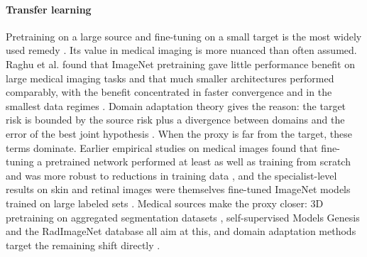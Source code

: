 \documentclass[acmsmall,screen,review]{acmart}
\theoremstyle{acmdefinition}
\begin{document}
\paragraph{Transfer learning} Pretraining on a large source and fine-tuning on a small target is the most widely used remedy \cite{pan2010survey}. Its value in medical imaging is more nuanced than often  assumed. Raghu et al. found that ImageNet pretraining gave little performance benefit on large medical imaging tasks and that much smaller architectures performed comparably, with the benefit concentrated in faster convergence and in the smallest data regimes \cite{raghu2019transfusion}. Domain adaptation theory gives the reason: the target risk is bounded by the source risk plus a divergence between domains and the error of the best joint hypothesis \cite{bendavid2010theory}. When the proxy is far from the target, these terms dominate. Earlier empirical studies on medical images found that fine-tuning a pretrained network performed at least as well as training from scratch and was more robust to reductions in training data \cite{shin2016deep,tajbakhsh2016convolutional}, and the specialist-level results on skin and retinal images were themselves fine-tuned ImageNet models trained on large labeled sets \cite{esteva2017dermatologist,gulshan2016development}. Medical sources make the proxy closer: 3D pretraining on aggregated segmentation datasets \cite{chen2019med3d}, self-supervised Models Genesis \cite{zhou2021models} and the RadImageNet database \cite{mei2022radimagenet} all aim at this, and domain adaptation methods target the remaining shift directly \cite{guan2022domain,kamnitsas2017unsupervised}.
\end{document}

